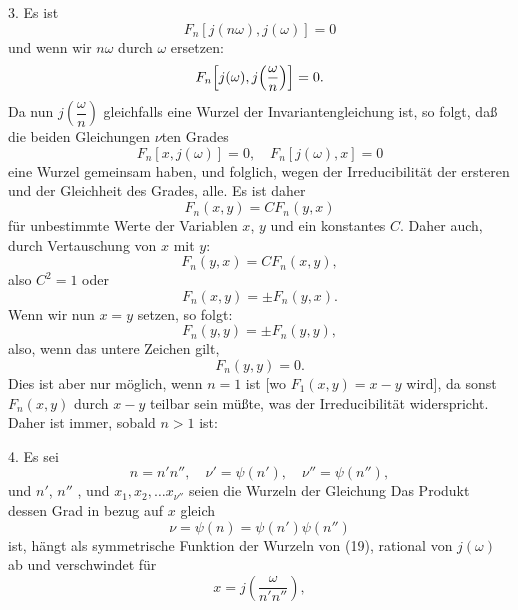 3. Es ist
\[
F_n[j(n\omega), j(\omega)] = 0
\]
und wenn wir $n\omega$ durch $\omega$ ersetzen:
\[
F_n\Bigl[j(\omega), j\Bigl(\frac{\omega}{n}\Bigr)\Bigr] = 0.
\]
Da nun $j\left(\dfrac{\omega}{n}\right)$ gleichfalls eine Wurzel der Invariantengleichung ist, so folgt, daß die beiden Gleichungen $\nu$ten Grades
\[
F_n[x, j(\omega)] = 0, \quad F_n[j(\omega), x] = 0
\]
eine Wurzel gemeinsam haben, und folglich, wegen der Irreducibilität der ersteren und der Gleichheit des Grades, alle. Es ist daher
\[
F_n(x, y) = C F_n(y, x)
\]
für unbestimmte Werte der Variablen $x$, $y$ und ein konstantes $C$.
Daher auch, durch Vertauschung von $x$ mit $y$:
\[
F_n(y, x) = C F_n(x, y),
\]
also $C^2 = 1$ oder
\[
F_n(x, y) = \pm F_n(y, x).
\]
Wenn wir nun $x = y$ setzen, so folgt:
\[
F_n(y, y) = \pm F_n(y, y),
\]
also, wenn das untere Zeichen gilt,
\[
F_n(y, y) = 0.
\]
Dies ist aber nur möglich, wenn $n = 1$ ist [wo $F_1(x, y) = x - y$ wird], da sonst $F_n(x, y)$ durch $x - y$ teilbar sein müßte, was der Irreducibilität widerspricht. Daher ist immer, sobald $n > 1$ ist:

4. Es sei
\[
n = n' n'', \quad \nu' = \psi(n'), \quad \nu'' = \psi(n''),
\]
und $n'$, $n''$ , und $x_1, x_2, \dots x_{\nu''}$ seien die Wurzeln der Gleichung
Das Produkt
dessen Grad in bezug auf $x$ gleich
\[
\nu = \psi(n) = \psi(n') \psi(n'')
\]
ist, hängt als symmetrische Funktion der Wurzeln von (19), rational von $j(\omega)$ ab und verschwindet für
\[
x = j\left(\frac{\omega}{n' n''}\right),
\]
